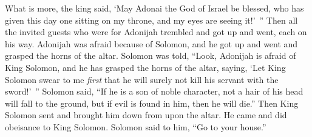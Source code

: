 \begin{biblechapter}
\verse What is more, the king said, ‘May Adonai the God of Israel be blessed, who has given this day one sitting on my throne, and my eyes are seeing it!’ ”
\verse Then all the invited guests who were for Adonijah trembled and got up and went, each on his way.
\verse Adonijah was afraid because of Solomon, and he got up and went and grasped the horns of the altar.
\verse Solomon was told, “Look, Adonijah is afraid of King Solomon, and he has grasped the horns of the altar, saying, ‘Let King Solomon swear to me \textit{first} that he will surely not kill his servant with the sword!’ ”
\verse Solomon said, “If he is a son of noble character, not a hair of his head will fall to the ground, but if evil is found in him, then he will die.”
\verse Then King Solomon sent and brought him down from upon the altar. He came and did obeisance to King Solomon. Solomon said to him, “Go to your house.”
\end{biblechapter}

